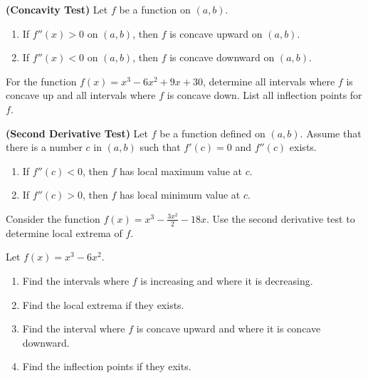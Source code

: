 \begin{proposition}

\textbf{(Concavity Test)} Let \(f\) be a function on \((a, b)\).

\begin{enumerate}
\item
  If \(f''(x)>0\) on \((a, b)\), then \(f\) is concave upward on
  \((a, b)\).
\item
  If \(f''(x)<0\) on \((a, b)\), then \(f\) is concave downward on
  \((a, b)\).
\end{enumerate}

\end{proposition}

\begin{example}

For the function \(f(x)=x^3 - 6x^2+9x+30\), determine all intervals where
\(f\) is concave up and all intervals where \(f\) is concave down. List
all inflection points for \(f\).

\end{example}
\vspace*{6\baselineskip}

\begin{proposition}

\textbf{(Second Derivative Test)} Let \(f\) be a function defined on
\((a, b)\). Assume that there is a number \(c\) in \((a, b)\) such that
\(f'(c)=0\) and \(f''(c)\) exists.

\begin{enumerate}
\item
  If \(f''(c)<0\), then \(f\) has local maximum value at \(c\).
\item
  If \(f''(c)>0\), then \(f\) has local minimum value at \(c\).
\end{enumerate}

\end{proposition}

\begin{example}

Consider the function \(f(x)=x^3 - \frac{3x^2}{2} - 18x\). Use the second
derivative test to determine local extrema of \(f\).

\end{example}
\vspace*{6\baselineskip}

\begin{example}

Let \(f(x)=x^3-6x^2\).

\begin{enumerate}
\item
  Find the intervals where \(f\) is increasing and where it is
  decreasing.
\item
  Find the local extrema if they exists.
\item
  Find the interval where \(f\) is concave upward and where it is
  concave downward.
\item
  Find the inflection points if they exits.
\end{enumerate}

\end{example}

